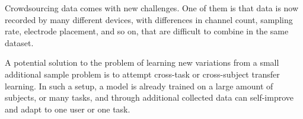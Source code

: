     Crowdsourcing data comes with new challenges. One of them is that data is now recorded by many different devices, with differences in channel count, sampling rate, electrode placement, and so on, that are difficult to combine in the same dataset. 

    A potential solution to the problem of learning new variations from a small additional sample problem is to attempt cross-task or cross-subject transfer learning. In such a setup, a model is already trained on a large amount of subjects, or many tasks, and through additional collected data can self-improve and adapt to one user or one task.



